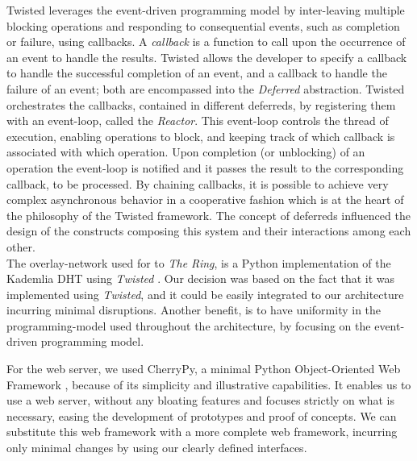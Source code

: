 \documentclass[12pt, titlepage]{uo_temp}
\begin{document}
     Twisted leverages the event-driven programming model by inter-leaving multiple
     blocking operations and responding to consequential events, such as completion or
     failure, using callbacks. A \emph{callback} is a function to call upon the occurrence
     of an event to handle the results. Twisted allows the developer to specify a callback
     to handle the successful completion of an event, and a callback to handle the failure
     of an event; both are encompassed into the \emph{Deferred} abstraction. Twisted
     orchestrates the callbacks, contained in different deferreds, by registering them
     with an event-loop, called the \emph{Reactor}. This event-loop controls the thread of
     execution, enabling operations to block, and keeping track of which callback is
     associated with which operation. Upon completion (or unblocking) of an operation the
     event-loop is notified and it passes the result to the corresponding callback, to
     be processed. By chaining callbacks, it is possible to achieve very complex asynchronous
     behavior in a cooperative fashion which is at the heart of the philosophy of the
     Twisted framework.
     The concept of deferreds influenced the design of the constructs composing this
     system and their interactions among each other.\\

     The overlay-network used for to \emph{The Ring}, is a Python implementation of the
     Kademlia DHT using \emph{Twisted} \cite{kademlia_python}. Our decision was based on
     the fact that it was implemented using \emph{Twisted}, and it could be easily
     integrated to our architecture incurring minimal disruptions. Another benefit, is to
     have uniformity in the programming-model used throughout the architecture, by
     focusing on the event-driven programming model.

     For the web server, we used CherryPy, a minimal Python Object-Oriented Web Framework
     \cite{cherrypy}, because of its simplicity and illustrative capabilities. It enables
     us to use a web server, without any bloating features and focuses strictly on what is
     necessary, easing the development of prototypes and proof of concepts. We can
     substitute this web framework with a more complete web framework, incurring only
     minimal changes by using our clearly defined interfaces.
\end{document}
